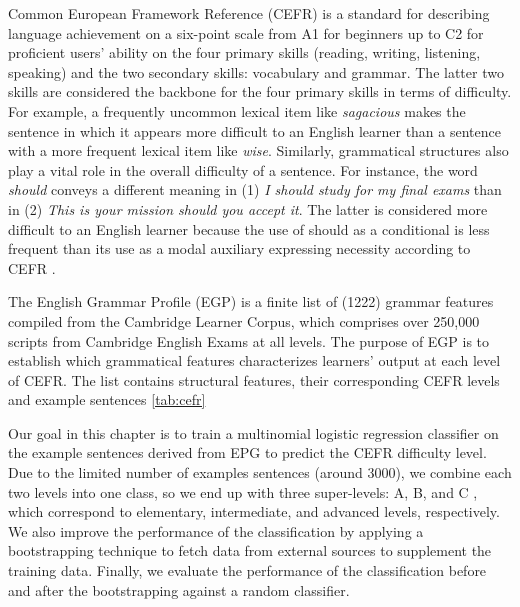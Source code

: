 Common European Framework Reference (CEFR) is a standard for describing language achievement on a six-point scale from A1 for beginners up to C2 for proficient users' ability on the four primary skills (reading, writing, listening, speaking) and the two secondary skills: vocabulary and grammar. The latter two skills are considered the backbone for the four primary skills in terms of difficulty. For example, a frequently uncommon lexical item like \emph{sagacious} makes the sentence in which it appears more difficult to an English learner than a sentence with a more frequent lexical item like \emph{wise}. Similarly, grammatical structures also play a vital role in the overall difficulty of a sentence. For instance, the word \emph{should} conveys a different meaning in (1) \emph{I should study for my final exams} than in (2) \emph{This is your mission should you accept it}. The latter is considered more difficult to an English learner because the use of should as a conditional is less frequent than its use as a modal auxiliary expressing necessity according to CEFR \citep{council2001common}. 

The English Grammar Profile (EGP) \citep{o2017english} is a finite list of (1222) grammar features compiled from the Cambridge Learner Corpus, which comprises over 250,000 scripts from Cambridge English Exams at all levels. The purpose of EGP is to establish which grammatical features characterizes learners' output at each level of CEFR. \citep{o2017english} The list contains structural features, their corresponding CEFR levels and example sentences \ref{tab:cefr}

Our goal in this chapter is to train a multinomial logistic regression classifier on the example sentences derived from EPG to predict the CEFR difficulty level. Due to the limited number of examples sentences (around 3000), we combine each two levels into one class, so we end up with three super-levels: A, B, and C , which correspond to  elementary, intermediate, and advanced levels, respectively. We also improve the performance of the classification by applying a bootstrapping technique \citep{yarowsky_unsupervised_1995} to fetch data from external sources to supplement the training data. Finally, we evaluate the performance of the classification before and after the bootstrapping against a random classifier.

